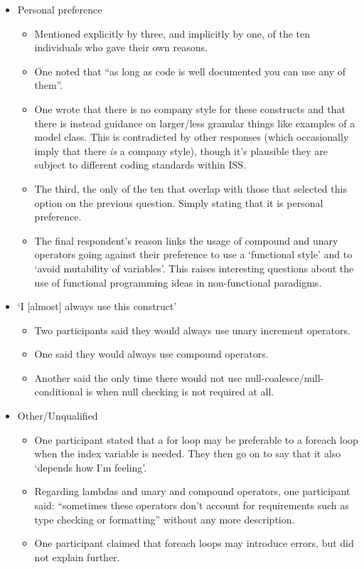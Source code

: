 \documentclass{article}
\begin{document}
            \begin{itemize}
                \item Personal preference
                \begin{itemize}
                    \item Mentioned explicitly by three, and implicitly by one, of the ten individuals who gave their own reasons.
                    \item One noted that ``as long as code is well documented you can use any of them''.
                    \item One wrote that there is no company style for these constructs and that there is instead guidance on larger/less granular things like examples of a model class. This is contradicted by other responses (which occasionally imply that there \emph{is} a company style), though it's plausible they are subject to different coding standards within ISS.
                    \item The third, the only of the ten that overlap with those that selected this option on the previous question. Simply stating that it is personal preference.
                    \item The final respondent's reason links the usage of compound and unary operators going against their preference to use a `functional style' and to `avoid mutability of variables'. This raises interesting questions about the use of functional programming ideas in non-functional paradigms.
                \end{itemize}
                \item `I [almost] always use this construct'
                \begin{itemize}
                    \item Two participants said they would always use unary increment operators.
                    \item One said they would always use compound operators.
                    \item Another said the only time there would not use null-coalesce/null-conditional is when null checking is not required at all.
                \end{itemize}
                \item Other/Unqualified
                \begin{itemize}
                    \item One participant stated that a for loop may be preferable to a foreach loop when the index variable is needed. They then go on to say that it also `depends how I'm feeling'.
                    \item Regarding lambdas and unary and compound operators, one participant said: ``sometimes these operators don't account for requirements such as type checking or formatting'' without any more description.
                    \item One participant claimed that foreach loops may introduce errors, but did not explain further.
                \end{itemize}
            \end{itemize}
\end{document}
